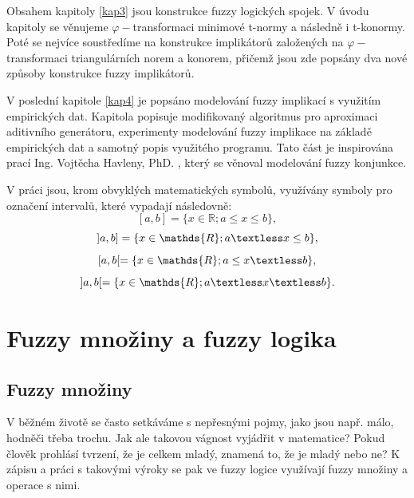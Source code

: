  Obsahem kapitoly \ref{kap3} jsou  konstrukce fuzzy logických spojek. V úvodu  kapitoly se věnujeme $\varphi-$transformaci minimové t-normy a následně i t-konormy. Poté se nejvíce soustředíme na konstrukce implikátorů založených na $\varphi-$transformaci triangulárních norem a konorem, přičemž jsou zde  popsány dva nové způsoby  konstrukce fuzzy implikátor\r u. 

 V poslední kapitole \ref{kap4} je popsáno modelování fuzzy implikací s využitím empirických dat. Kapitola popisuje modifikovaný algoritmus pro aproximaci aditivního generátoru, experimenty modelování fuzzy implikace na základě empirických dat a samotný popis využitého programu. Tato část je inspirována prací Ing. Vojtěcha Havleny, PhD. \cite{havlena}, který se věnoval modelování fuzzy konjunkce. 

 V práci jsou, krom obvyklých matematických symbol\r u, využívány symboly pro označení interval\r u, které vypadají následovně:
 $$[a,b] = \{x \in \mathds{R}; a \leq x \leq b \},$$
  $$]a,b] = \{x \in \mathds{R}; a \textless x \leq b \},$$
   $$[a,b[ = \{x \in \mathds{R}; a \leq x \textless b \},$$
    $$]a,b[ = \{x \in \mathds{R}; a \textless x \textless b \}.$$





\chapter {Fuzzy mno\v ziny a fuzzy logika}
\label{kap2}
\section{Fuzzy mno\v ziny} 


V běžném životě se často setkáváme s nepřesnými pojmy, jako jsou např. \clqq málo\crqq, \clqq hodně\crqq \space či třeba \clqq trochu\crqq. Jak ale takovou vágnost vyjádřit v matematice? Pokud člověk prohlásí tvrzení, že je \clqq celkem mladý\crqq, znamená to, že je mladý nebo ne? K zápisu a práci s takovými výroky se pak ve fuzzy logice využívají fuzzy množiny a operace s nimi.

